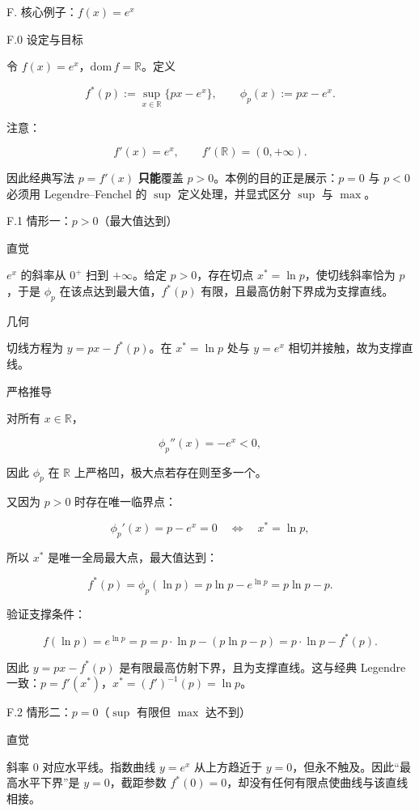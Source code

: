 \documentclass[
    lang=cn,
    color=blue,
    mode=fancy,
    thmcnt=section,
    scheme=chinese
]{elegantbook}
\begin{document}
\par
F. 核心例子：$f(x) = e^x$

F.0 设定与目标

令 $f(x) = e^x$，$\mathrm{dom}\, f = \mathbb{R}$。定义

\[
f^*(p) := \sup_{x \in \mathbb{R}} \bigl\{ px - e^x \bigr\}, \qquad \phi_p(x) := px - e^x.
\]

注意：

\[
f'(x) = e^x, \qquad f'(\mathbb{R}) = (0, +\infty).
\]

因此经典写法 $p = f'(x)$ \textbf{只能}覆盖 $p > 0$。本例的目的正是展示：$p = 0$ 与 $p < 0$ 必须用 Legendre–Fenchel 的 $\sup$ 定义处理，并显式区分 $\sup$ 与 $\max$。

\par
F.1 情形一：$p > 0$（最大值达到）

直觉

$e^x$ 的斜率从 $0^+$ 扫到 $+\infty$。给定 $p > 0$，存在切点 $x^* = \ln p$，使切线斜率恰为 $p$，于是 $\phi_p$ 在该点达到最大值，$f^*(p)$ 有限，且最高仿射下界成为支撑直线。

几何

切线方程为 $y = p x - f^*(p)$。在 $x^* = \ln p$ 处与 $y = e^x$ 相切并接触，故为支撑直线。

严格推导

对所有 $x\in\mathbb{R}$，

\[
\phi_p''(x) = -e^x < 0,
\]

因此 $\phi_p$ 在 $\mathbb{R}$ 上严格凹，极大点若存在则至多一个。

又因为 $p>0$ 时存在唯一临界点：

\[
\phi_p'(x) = p - e^x = 0 \quad\Longleftrightarrow\quad x^* = \ln p,
\]

所以 $x^*$ 是唯一全局最大点，最大值达到：

\[
f^*(p) = \phi_p(\ln p) = p \ln p - e^{\ln p} = p \ln p - p.
\]

验证支撑条件：

\[
f(\ln p) = e^{\ln p} = p = p \cdot \ln p - (p \ln p - p) = p \cdot \ln p - f^*(p).
\]

因此 $y = px - f^*(p)$ 是有限最高仿射下界，且为支撑直线。这与经典 Legendre 一致：$p = f'(x^*)$，$x^* = (f')^{-1}(p) = \ln p$。

\par
F.2 情形二：$p = 0$（$\sup$ 有限但 $\max$ 达不到）

直觉

斜率 $0$ 对应水平线。指数曲线 $y = e^x$ 从上方趋近于 $y = 0$，但永不触及。因此“最高水平下界”是 $y = 0$，截距参数 $f^*(0) = 0$，却没有任何有限点使曲线与该直线相接。
\end{document}
